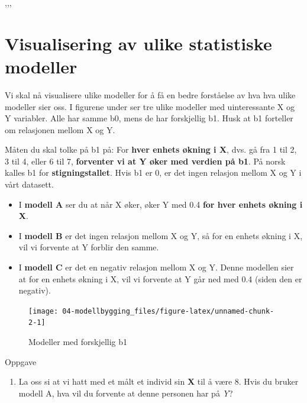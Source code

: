 \documentclass[
]{book}
\providecommand{\tightlist}{%
  \setlength{\itemsep}{0pt}\setlength{\parskip}{0pt}}
\begin{document}
,,,

\hypertarget{visualisering-av-ulike-statistiske-modeller}{%
\section{Visualisering av ulike statistiske modeller}\label{visualisering-av-ulike-statistiske-modeller}}

Vi skal nå visualisere ulike modeller for å få en bedre forståelse av hva hva ulike modeller sier oss. I figurene under ser tre ulike modeller med uinteressante X og Y variabler. Alle har samme b0, mens de har forskjellig b1. Husk at b1 forteller om relasjonen mellom X og Y.

Måten du skal tolke på b1 på: For \textbf{hver enhets økning i X}, dvs. gå fra 1 til 2, 3 til 4, eller 6 til 7, \textbf{forventer vi at Y øker med verdien på b1}. På norsk kalles b1 for \textbf{stigningstallet}. Hvis b1 er 0, er det ingen relasjon mellom X og Y i vårt datasett.

\begin{itemize}
\item
  I \textbf{modell A} ser du at når X øker, øker Y med 0.4 \textbf{for hver enhets økning i X}.
\item
  I \textbf{modell B} er det ingen relasjon mellom X og Y, så for en enhets økning i X, vil vi forvente at Y forblir den samme.
\item
  I \textbf{modell C} er det en negativ relasjon mellom X og Y. Denne modellen sier at for en enhets økning i X, vil vi forvente at Y går ned med 0.4 (siden den er negativ).
\end{itemize}

\begin{figure}

{\centering \texttt{[image: 04-modellbygging\_files/figure-latex/unnamed-chunk-2-1]} 

}

\caption{Modeller med forskjellig b1}\label{fig:unnamed-chunk-2}
\end{figure}

{Oppgave}

\begin{enumerate}
\def\labelenumi{\alph{enumi}.}
\tightlist
\item
  La oss si at vi hatt med et målt et individ sin \textbf{X} til å være 8. Hvis du bruker modell A, hva vil du forvente at denne personen har på \emph{Y}?
\end{enumerate}
\end{document}
